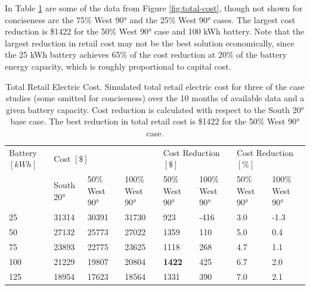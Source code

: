 \documentclass[journal,article,submit,pdftex,moreauthors]{Definitions/mdpi}
\begin{document}
In Table \ref{tab:total-cost} are some of the data from Figure \ref{fig:total-cost}, though not shown for conciseness are the 75\% West 90° and the 25\% West 90° cases. The largest cost reduction is \$1422 for the 50\% West 90° case and 100 kWh battery. Note that the largest reduction in retail cost may not be the best solution economically, since the 25 kWh battery achieves 65\% of the cost reduction at 20\% of the battery energy capacity, which is roughly proportional to capital cost.

\begin{table}[!h]
  \centering
  \caption{Total Retail Electric Cost. Simulated total retail electric cost for three of the case studies (some omitted for conciseness) over the 10 months of available data and a given battery capacity. Cost reduction is calculated with respect to the South 20° base case. The best reduction in total retail cost is \$1422 for the 50\% West 90° case.}
  \label{tab:total-cost}
  \begin{tabularx}{\textwidth}{XXXXXXXX}
    \toprule
    Battery $[kWh]$ & \multicolumn{3}{l}{Cost $[\$]$} & \multicolumn{2}{l}{Cost Reduction $[\$]$} & \multicolumn{2}{l}{Cost Reduction $[\%]$}                                                                   \\
                    & South 20°                       & 50\% West 90°                             & 100\% West 90°                            & 50\% West 90° & 100\% West 90° & 50\% West 90° & 100\% West 90° \\
    \midrule
    25              & 31314                           & 30391                                     & 31730                                     & 923           & -416           & 3.0           & -1.3           \\
    50              & 27132                           & 25773                                     & 27022                                     & 1359          & 110            & 5.0           & 0.4            \\
    75              & 23893                           & 22775                                     & 23625                                     & 1118          & 268            & 4.7           & 1.1            \\
    100             & 21229                           & 19807                                     & 20804                                     & \textbf{1422} & 425            & 6.7           & 2.0            \\
    125             & 18954                           & 17623                                     & 18564                                     & 1331          & 390            & 7.0           & 2.1            \\

\end{tabularx}
\end{table}
\end{document}
